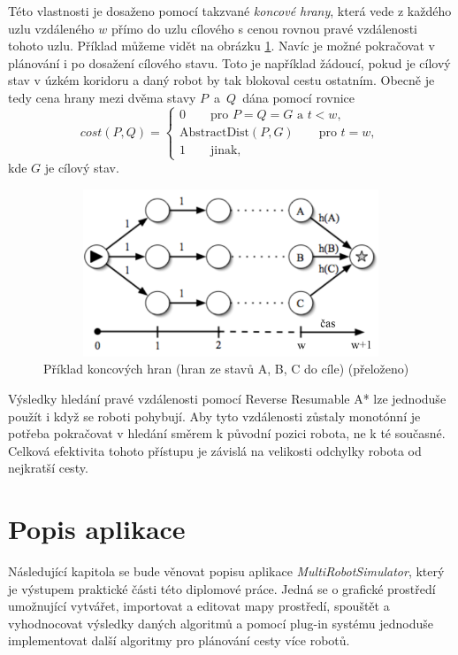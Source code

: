 Této vlastnosti je dosaženo pomocí takzvané \emph{koncové hrany}, která vede z každého uzlu vzdáleného $w$ přímo do uzlu cílového s cenou rovnou pravé vzdálenosti tohoto uzlu. Příklad můžeme vidět na obrázku \ref{obr:terminalEdge}. Navíc je možné pokračovat v plánování i po dosažení cílového stavu. Toto je například žádoucí, pokud je cílový stav v úzkém koridoru a daný robot by tak blokoval cestu ostatním. Obecně je tedy cena hrany mezi dvěma stavy $P$~a~$Q$~dána pomocí rovnice
\begin{equation}
cost\left(P,Q\right)=\begin{cases}
0 \qquad \text{pro }P=Q=G\text{ a }t<w, \\
\text{AbstractDist}\left(P,G\right) \qquad \text{pro }t=w, \\
1 \qquad \text{jinak},
\end{cases}
\end{equation}
kde $G$ je cílový stav.

\begin{figure}[htb]
	\begin{center}
		\includegraphics*[width=13cm,height=5cm,keepaspectratio]{obr/terminalEdge2}
	\end{center}
	\caption[caption]{Příklad koncových hran (hran ze stavů A, B, C do cíle) \cite{Silver2006} (přeloženo)}
	\label{obr:terminalEdge}
\end{figure}

Výsledky hledání pravé vzdálenosti pomocí Reverse Resumable A* lze jednoduše použít i když se roboti pohybují. Aby tyto vzdálenosti zůstaly monotónní je potřeba pokračovat v hledání směrem k původní pozici robota, ne k té současné. Celková efektivita tohoto přístupu je závislá na velikosti odchylky robota od nejkratší cesty.

\cleardoublepage
\chapter{Popis aplikace}
Následující kapitola se bude věnovat popisu aplikace \emph{MultiRobotSimulator}, který je výstupem praktické části této diplomové práce. Jedná se o grafické prostředí umožnující vytvářet, importovat a editovat mapy prostředí, spouštět a vyhodnocovat výsledky daných algoritmů a pomocí plug-in systému jednoduše implementovat další algoritmy pro plánování cesty více robotů.

